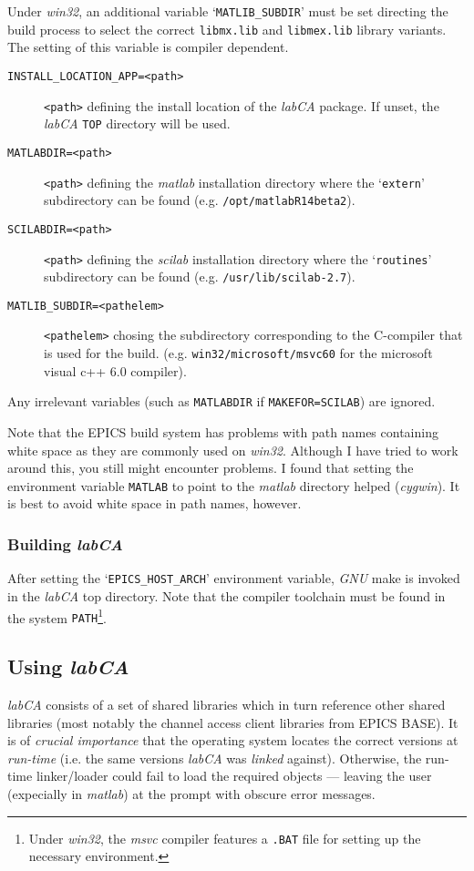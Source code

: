 \documentclass{article}
\newcommand{\sca}{\ita{labCA}}
\newcommand{\scilab}{\ita{scilab}}
\newcommand{\matlab}{\ita{matlab}}
\newcommand{\windoze}{\ita{win32}}
\newcommand{\com}[1]{{\tt #1}}
\newcommand{\pbrk}{\pagebreak[3]}
\newcommand{\ita}[1]{\emph{#1}}
\renewcommand{\pbrk}{}
\begin{document}
\begin{description}
Under \windoze{}, an additional variable
`\com{MATLIB\_SUBDIR}' must be set directing the build process to select the correct
\com{libmx.lib} and \com{libmex.lib} library variants. The setting of this variable
is compiler dependent.
\begin{description}
\item[\tt INSTALL\_LOCATION\_APP=<path>] \com{<path>} defining the
install location of the \sca{} package. If unset, the \sca{} \com{TOP}
directory will be used.
\item[\tt MATLABDIR=<path>] \com{<path>} defining the \matlab{} installation
directory where the `\com{extern}' subdirectory can be found (e.g.
\com{/opt/matlabR14beta2}).
\item[\tt SCILABDIR=<path>] \com{<path>} defining the \scilab{} installation
directory where the `\com{routines}' subdirectory can be found (e.g.
\com{/usr/lib/scilab-2.7}).
\item[\tt MATLIB\_SUBDIR=<pathelem>] \com{<pathelem>} chosing the subdirectory
corresponding to the C-compiler that is used for the build. (e.g. 
\com{win32/microsoft/msvc60} for the microsoft visual c++ 6.0 compiler).
\end{description}
\end{description}
Any irrelevant variables (such as \com{MATLABDIR} if \com{MAKEFOR=SCILAB})
are ignored.

Note that the EPICS build system has problems with path names containing
white space as they are commonly used on \windoze. Although I have
tried to work around this, you still might encounter problems. I found
that setting the environment variable \com{MATLAB} to point to the \matlab{}
directory helped (\ita{cygwin}). It is best to avoid white space in path
names, however.

\subsubsection{Building \sca}
After setting the
`\com{EPICS\_HOST\_ARCH}' environment variable, \ita{GNU} make is invoked in the \sca{} top 
directory. Note that the compiler toolchain must be found in the system
\com{PATH}\footnote{
Under \windoze, the \ita{msvc} compiler features a \com{.BAT} file for
setting up the necessary environment.
}.

\pbrk
\subsection{Using \sca{}}
\label{usingsca}
\sca{} consists of a set of shared libraries which in turn reference
other shared libraries (most notably the channel access client libraries
from EPICS BASE). It is of \ita{crucial importance} that the operating
system locates the correct versions at \ita{run-time} (i.e. the same versions
\sca{} was \ita{linked} against). Otherwise, the run-time linker/loader
could fail to load the required objects --- leaving the user (expecially
in \matlab) at the prompt with obscure error messages.
\end{document}
